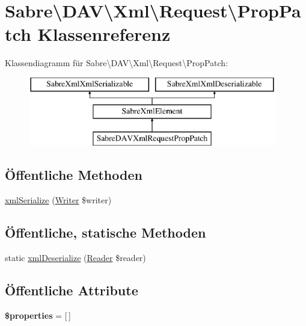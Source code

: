 \hypertarget{class_sabre_1_1_d_a_v_1_1_xml_1_1_request_1_1_prop_patch}{}\section{Sabre\textbackslash{}D\+AV\textbackslash{}Xml\textbackslash{}Request\textbackslash{}Prop\+Patch Klassenreferenz}
\label{class_sabre_1_1_d_a_v_1_1_xml_1_1_request_1_1_prop_patch}
Klassendiagramm für Sabre\textbackslash{}D\+AV\textbackslash{}Xml\textbackslash{}Request\textbackslash{}Prop\+Patch\+:\begin{figure}[H]
\begin{center}
\leavevmode
\includegraphics[height=3.000000cm]{class_sabre_1_1_d_a_v_1_1_xml_1_1_request_1_1_prop_patch}
\end{center}
\end{figure}
\subsection*{Öffentliche Methoden}
\begin{DoxyCompactItemize}
\item 
\mbox{\hyperlink{class_sabre_1_1_d_a_v_1_1_xml_1_1_request_1_1_prop_patch_a6387552bc8dabc8ba491ead0c84886ea}{xml\+Serialize}} (\mbox{\hyperlink{class_sabre_1_1_xml_1_1_writer}{Writer}} \$writer)
\end{DoxyCompactItemize}
\subsection*{Öffentliche, statische Methoden}
\begin{DoxyCompactItemize}
\item 
static \mbox{\hyperlink{class_sabre_1_1_d_a_v_1_1_xml_1_1_request_1_1_prop_patch_ac74d98985e31da7cb22333993b6f0cc6}{xml\+Deserialize}} (\mbox{\hyperlink{class_sabre_1_1_xml_1_1_reader}{Reader}} \$reader)
\end{DoxyCompactItemize}
\subsection*{Öffentliche Attribute}
\begin{DoxyCompactItemize}
\item 
\mbox{\label{class_sabre_1_1_d_a_v_1_1_xml_1_1_request_1_1_prop_patch_a54da747812d7206bf9066e4e30fefa3c}} 
{\bfseries \$properties} = \mbox{[}$\,$\mbox{]}
\end{DoxyCompactItemize}



